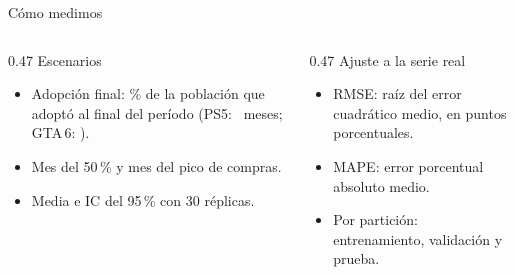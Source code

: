 \documentclass[aspectratio=169,11pt,notes=only]{beamer}
\newcommand{\seccion}{}
\begin{document}
\renewcommand{\seccion}{Medidas de desempeño}
\begin{frame}{Cómo medimos}
  \vskip4mm
  \begin{columns}[T,totalwidth=\textwidth]
    \begin{column}{0.47\textwidth}
      {\plexmedia\color{azul}Escenarios}\par\vskip1mm
      {\small\begin{itemize}
        \item \alert{Adopción final}: \% de la población que adoptó al final del período (PS5: \cifraHorizontePs\ meses; GTA\,6: \cifraHorizonteGta).
        \item Mes del 50\,\% y mes del pico de compras.
        \item Media e IC del 95\,\% con 30 réplicas.
      \end{itemize}}
    \end{column}
    \begin{column}{0.47\textwidth}
      {\plexmedia\color{azul}Ajuste a la serie real}\par\vskip1mm
      {\small\begin{itemize}
        \item RMSE: raíz del error cuadrático medio, en puntos porcentuales.
        \item MAPE: error porcentual absoluto medio.
        \item Por partición: entrenamiento, validación y prueba.
      \end{itemize}}
    \end{column}
  \end{columns}
\end{frame}
\end{document}
